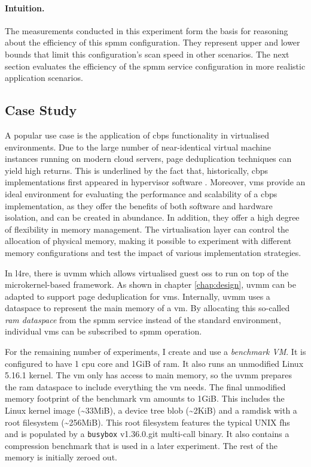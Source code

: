\paragraph{Intuition.}

The measurements conducted in this experiment form the basis for reasoning about the efficiency of this \ac{spmm} configuration.
They represent upper and lower bounds that limit this configuration's scan speed in other scenarios.
The next section evaluates the efficiency of the \ac{spmm} service configuration in more realistic application scenarios.

\subsection{Case Study}
\label{subsec:case-study}

A popular use case is the application of \ac{cbps} functionality in virtualised environments.
Due to the large number of near-identical virtual machine instances running on modern cloud servers, page deduplication techniques can yield high returns.
This is underlined by the fact that, historically, \ac{cbps} implementations first appeared in hypervisor software \cite{vmware-tps-patent}.
Moreover, \Acp{vm} provide an ideal environment for evaluating the performance and scalability of a \ac{cbps} implementation, as they offer the benefits of both software and hardware isolation, and can be created in abundance.
In addition, they offer a high degree of flexibility in memory management.
The virtualisation layer can control the allocation of physical memory, making it possible to experiment with different memory configurations and test the impact of various implementation strategies.

In \ac{l4re}, there is \ac{uvmm} which allows virtualised guest \acp{os} to run on top of the microkernel-based framework.
As shown in chapter \ref{chap:design}, \ac{uvmm} can be adapted to support page deduplication for \acp{vm}.
Internally, \ac{uvmm} uses a dataspace to represent the main memory of a \ac{vm}.
By allocating this so-called \emph{\acs{ram} dataspace} from the \ac{spmm} service instead of the standard environment, individual \acp{vm} can be subscribed to \ac{spmm} operation.

For the remaining number of experiments, I create and use a \emph{benchmark VM}.
It is configured to have 1 \ac{cpu} core and 1GiB of \ac{ram}.
It also runs an unmodified Linux 5.16.1 kernel.
The \ac{vm} only has access to main memory, so the \ac{uvmm} prepares the \ac{ram} dataspace to include everything the \ac{vm} needs.
The final unmodified memory footprint of the benchmark \ac{vm} amounts to 1GiB.
This includes the Linux kernel image (\textasciitilde{}33MiB), a device tree blob (\textasciitilde{}2KiB) and a ramdisk with a root filesystem (\textasciitilde{}256MiB).
This root filesystem features the typical UNIX \ac{fhs} and is populated by a \texttt{busybox} v1.36.0.git multi-call binary.
It also contains a compression benchmark that is used in a later experiment.
The rest of the memory is initially zeroed out.

